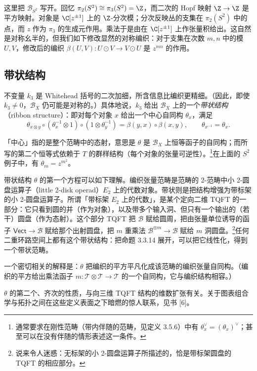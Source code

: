 \begin{example}这里把 $\mathcal{B}_{S^2}$ 写开。回忆 $\pi_2(S^2)\cong\pi_3(S^2)=\Z$，而二次的 Hopf 映射 $\Z\to\Z$ 是平方映射。对象是 $\C[z^{\pm1}]$ 上的 $\Z$-分次模；分次反映丛的支集在 $\pi_2(S^2)$ 中的点，而 $z$ 作为 $\pi_3$ 的生成元作用。乘法于是由在 $\C[z^{\pm1}]$ 上作张量积给出。这自然是对称幺半的，但我们如下修改显然的对称编织：对于支集在次数 $m,n$ 中的模 $U,V$，修改后的编织 $\beta(U,V)\colon U\odot V\to V\odot U$ 是 $z^{mn}$ 的作用。\end{example}

\subsection{带状结构}

不变量 $k_3$ 是 Whitehead 括号的二次加细，所含信息比编织更精细。（因此，即使 $k_3\neq0$，$\mathcal{B}_X$ 仍可能是对称的。）具体地说，$k_3$ 给出 $\mathcal{B}_X$ 上的一个\emph{带状结构}（ribbon structure）：即对每个对象 $x$ 给出一个中心自同构 $\theta_x$，满足
\[
\theta_{x\otimes y}\circ(\theta_x^{-1}\otimes1)\circ(1\otimes\theta_y^{-1})=\beta(y,x)\circ\beta(x,y),\qquad
\theta_{x^{-1}}=\theta_x.
\]

「中心」指的是整个范畴中的态射，意思是 $\theta$ 是 $\mathcal{B}_X$ 上恒等函子的自同构；而所写的第二个恒等式依赖于 $T$ 的群样结构（每个对象的张量可逆性）。\footnote{通常要求在刚性范畴（带内伴随的范畴，见定义 3.5.6）中有 $\theta_x^{\vee}=(\theta_x)^{\vee}$；甚至可以在没有伴随的情形表述这一条件。}在上面的 $S^2$ 例子中，有 $\theta_m=z^{m^2}$。

带状结构 $\theta$ 的第一个方程可以如下理解。编织张量范畴是范畴的 2-范畴中小 2-圆盘运算子（little 2-disk operad）$E_2$ 上的代数对象。带状则是把结构增强为带标架的小 2-圆盘运算子。所谓「带标架 $E_2$ 上的代数」，是某个定向二维 TQFT 的一部分：它只看到圆的并（作为对象），以及带多个输入洞、但只有一个输出的（若干）圆盘（作为态射）。这个部分 TQFT 把 $\mathcal{B}$ 赋给圆周，把由张量单位诱导的函子 $\mathsf{Vect}\to\mathcal{B}$ 赋给那个出射圆盘，把 $m$ 重乘法 $\mathcal{B}^{\otimes m}\to\mathcal{B}$ 赋给 $m$ 洞圆盘。\footnote{说来令人迷惑：无标架的小 2-圆盘运算子所描述的，恰是带标架圆盘的 TQFT 的相应部分。}任何二重环路空间上都有这个带状结构：把命题 3.3.14 展开，可以把它线性化，得到一个带状范畴。

一个密切相关的解释是：$\theta$ 把编织的平方平凡化成该范畴的编织张量自同构。（编织的平方给出乘法函子 $m\colon\mathcal{T}\otimes\mathcal{T}\to\mathcal{T}$ 的一个自同构，它与编织结构相容。）

\begin{remark}$\theta$ 的第二个、齐次的性质，与向三维 TQFT 结构的维数扩张有关。关于图表组合学与拓扑之间在这些定义表面之下暗燃的惊人联系，见书 [6]。\end{remark}

